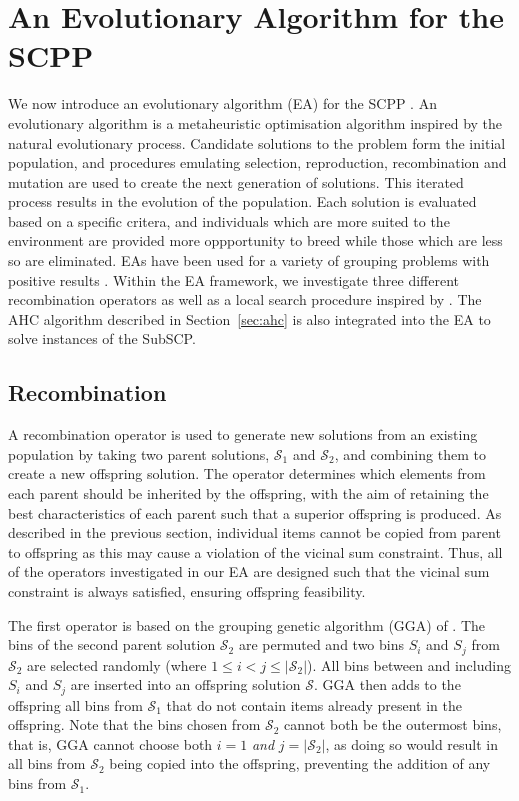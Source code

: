 \documentclass[authoryear]{elsarticle}
\begin{document}
\section{An Evolutionary Algorithm for the SCPP}
\label{sec:ea}
\noindent We now introduce an evolutionary algorithm (EA) for the SCPP . An evolutionary algorithm is a metaheuristic optimisation algorithm inspired by the natural evolutionary process. Candidate solutions to the problem form the initial population, and procedures emulating selection, reproduction, recombination and mutation are used to create the next generation of solutions. This iterated process results in the evolution of the population. Each solution is evaluated based on a specific critera, and individuals which are more suited to the environment are provided more oppportunity to breed while those which are less so are eliminated. EAs have been used for a variety of grouping problems with positive results \citep{lewis2017, falkenauer1996, quiroz2015}. Within the EA framework, we investigate three different recombination operators as well as a local search procedure inspired by \citet{martello1990l}. The AHC algorithm described in Section~\ref{sec:ahc} is also integrated into the EA to solve instances of the SubSCP.

\subsection{Recombination}
\label{sub:xover}
\noindent A recombination operator is used to generate new solutions from an existing population by taking two parent solutions, $\mathcal{S}_1$ and $\mathcal{S}_2$, and combining them to create a new offspring solution. The operator determines which elements from each parent should be inherited by the offspring, with the aim of retaining the best characteristics of each parent such that a superior offspring is produced. As described in the previous section, individual items cannot be copied from parent to offspring as this may cause a violation of the vicinal sum constraint. Thus, all of the operators investigated in our EA are designed such that the vicinal sum constraint is always satisfied, ensuring offspring feasibility.

The first operator is based on the grouping genetic algorithm (GGA) of \citet{falkenauer1992}. The bins of the second parent solution $\mathcal{S}_2$ are permuted and two bins $S_i$ and $S_j$ from $\mathcal{S}_2$ are selected randomly (where $1 \leq i < j \leq |\mathcal{S}_2|$). All bins between and including $S_i$ and $S_j$ are inserted into an offspring solution $\mathcal{S}$. GGA then adds to the offspring all bins from $\mathcal{S}_1$ that do not contain items already present in the offspring. Note that the bins chosen from $\mathcal{S}_2$ cannot both be the outermost bins, that is, GGA cannot choose both $i = 1$ \emph{and} $j = |\mathcal{S}_2|$, as doing so would result in all bins from $\mathcal{S}_2$ being copied into the offspring, preventing the addition of any bins from $\mathcal{S}_1$.
\end{document}
